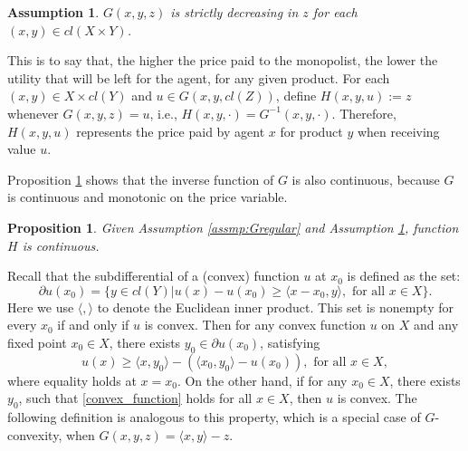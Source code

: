 \documentclass[a4paper, 11pt]{amsart}
\numberwithin{equation}{section}
\theoremstyle{plain}
\newtheorem{proposition}[theorem]{Proposition}
\newtheorem{assumption}{Assumption}
\theoremstyle{definition}
\theoremstyle{remark}
\begin{document}
 
 
 \begin{assumption}\label{assmp:Gdecreasing}
 	$G(x,y,z)$ is strictly decreasing in $z$ %
 	for each $(x,y) \in cl(X \times Y)$.
 \end{assumption}
 
 
 This is to say that, the higher the price paid to the monopolist, the lower the utility that will be left for the agent, for any given product. %
 For each $(x, y) \in X\times cl(Y)$ %
 and $u\in G(x,y, cl(Z))$, define $H(x,y,u) := z$ %
 whenever $G(x,y,z) = u$, i.e., $H(x, y, \cdot)= G^{-1}(x,y,\cdot)$. Therefore, $H(x,y,u)$ represents the price paid by agent $x$ for product $y$ when receiving value $u$.\medskip
 
 Proposition \ref{lemma_continuity} shows that the inverse function of $G$ is also continuous, because $G$ is continuous and monotonic on the price variable. \medskip
 
 \begin{proposition}\label{lemma_continuity}
 	Given Assumption \ref{assmp:Gregular} and Assumption \ref{assmp:Gdecreasing}, function $H$ is continuous.
 \end{proposition}

{Recall that the subdifferential of a (convex) function $u$ at $x_0$ is defined as the set:
	\begin{equation*}
	\partial u(x_0) = \{ y \in cl(Y)| u(x) - u(x_0) \ge \langle  x- x_0,  y \rangle, \text{ for all } x \in X  \}.
	\end{equation*}
	Here we use $ \langle , \rangle$ to denote the Euclidean inner product. This set is nonempty for every $x_0$ if and only if $u$ is convex.} Then for any convex function $u$ on $X$ and any fixed point $x_0 \in X$, there exists $y_0 \in \partial u(x_0)$, satisfying%
\begin{equation}\label{convex_function}
u(x) \ge  \langle x , y_0\rangle -( \langle x_0, y_0\rangle -  u(x_0)),	\text{  for all $x \in X$},
\end{equation} 
where equality holds at $x = x_0$. On the other hand, if for any $x_0\in X$, there exists $y_0$, such that \eqref{convex_function} holds for all $x\in X$, then $u$ is convex. The following definition is analogous to this property, which is a special case of $G$-convexity, when $G(x,y,z) = \langle x, y \rangle -z$.
\end{document}
